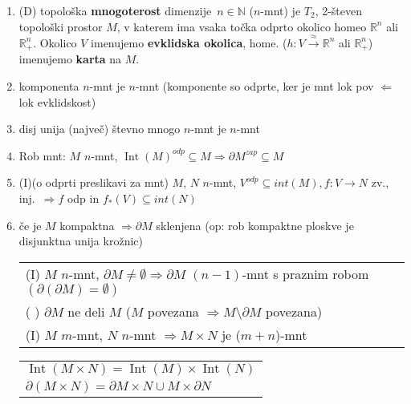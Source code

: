 \documentclass[10pt,a4paper]{article}
\DeclareMathOperator{\Int}{Int}
\begin{document}
\begin{enumerate}
\item (D) topološka \textbf{mnogoterost} dimenzije~$n \in \mathbb{N}$ ($n$-mnt) je $T_2$, 2-števen topološki prostor $M$, v katerem ima vsaka točka odprto okolico homeo $\mathbb{R}^n$ ali $\mathbb{R}^{n}_+$.
    Okolico $V$ imenujemo \textbf{evklidska okolica}, 
    home. ($h: V \stackrel{\approx}{\rightarrow} \mathbb{R}^n$ ali $\mathbb{R}^{n}_+$) imenujemo \textbf{karta} na $M$.

\item komponenta $n$-mnt je $n$-mnt (komponente so odprte, ker je mnt lok pov $\Leftarrow$ lok evklidskost) 
\item disj unija (največ) števno mnogo $n$-mnt je $n$-mnt 
\item Rob mnt: $M$ $n$-mnt, $\Int(M)^{odp} \subseteq M \Rightarrow \partial M^{zap} \subseteq M$


\item (I)(o odprti preslikavi za mnt) $M$, $N$ $n$-mnt, $V^{odp} \subseteq int(M), f: V \rightarrow N$ zv., inj.~$\Rightarrow f$ odp in $f_\ast (V) \subseteq int(N)$
\item če je $M$ kompaktna $\Rightarrow \partial M$ sklenjena (op: rob kompaktne ploskve je disjunktna unija krožnic) 

    \begin{tabular}{l}
        (I) $M$ $n$-mnt, $\partial M \neq \emptyset \Rightarrow \partial M$ $(n-1)$-mnt s praznim robom $(\partial (\partial M) = \emptyset)$  \\
        ( ) $\partial M$ ne deli $M$ ($M$ povezana $\Rightarrow M \setminus \partial M$ povezana) \\
        (I) $M$ $m$-mnt, $N$ $n$-mnt $\Rightarrow M \times N$ je ($m+n$)-mnt \\
    \end{tabular}
    \begin{tabular}{|l|}
        \hline
        $\Int(M \times N) = \Int(M) \times \Int(N)$ \\
        $\partial (M \times N) = \partial M \times N \cup M \times \partial N$ \\
        \hline
    \end{tabular}



\end{enumerate}
\end{document}
